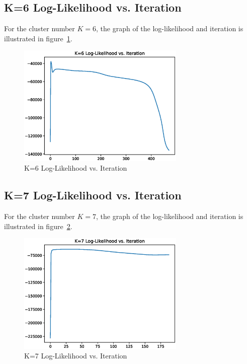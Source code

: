 \documentclass[11pt, a4paper]{article}
\begin{document}
\newpage

\subsection{K=6 Log-Likelihood vs. Iteration}

For the cluster number $K=6$, the graph of the log-likelihood and iteration is illustrated in figure~\ref{fig:kf13}.

\begin{figure}[htbp]
	
	\centering 
	\includegraphics[width=8cm]{6_6.eps}
	
	\caption{K=6 Log-Likelihood vs. Iteration}
	\label{fig:kf13}
	
\end{figure}

\subsection{K=7 Log-Likelihood vs. Iteration}

For the cluster number $K=7$, the graph of the log-likelihood and iteration is illustrated in figure~\ref{fig:kf14}.

\begin{figure}[htbp]
	
	\centering 
	\includegraphics[width=8cm]{6_7.eps}
	
	\caption{K=7 Log-Likelihood vs. Iteration}
	\label{fig:kf14}
	
\end{figure}
\end{document}
